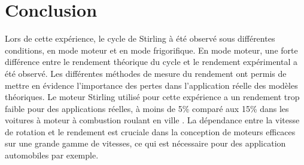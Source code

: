 \section{Conclusion}

Lors de cette expérience, le cycle de Stirling à été observé sous différentes conditions, en mode moteur et en mode frigorifique. En mode moteur, une forte différence entre le rendement théorique du cycle et le rendement expérimental a été observé. Les différentes méthodes de mesure du rendement ont permis de mettre en évidence l'importance des pertes dans l'application réelle des modèles théoriques. Le moteur Stirling utilisé pour cette expérience a un rendement trop faible pour des applications réelles, à moins de 5\% comparé aux 15\% dans les voitures à moteur à combustion roulant en ville \cite{voiture}. La dépendance entre la vitesse de rotation et le rendement est cruciale dans la conception de moteurs efficaces sur une grande gamme de vitesses, ce qui est nécessaire pour des application automobiles par exemple.
